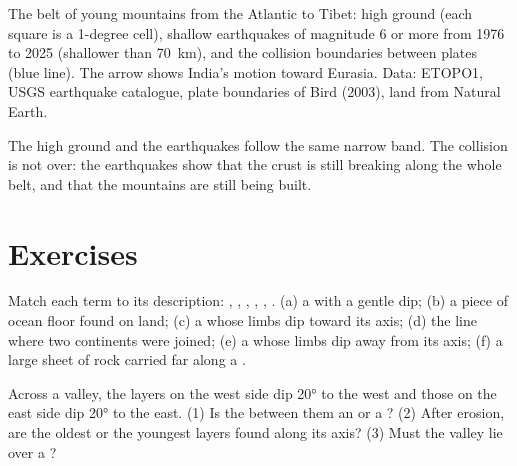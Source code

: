 \begin{omfigure}
{\small The belt of young mountains from the Atlantic to Tibet: high ground
(each square is a 1-degree cell), shallow earthquakes of magnitude 6 or more
from 1976 to 2025 (shallower than \qty{70}{km}), and the collision
boundaries between plates (blue line). The arrow shows India's motion
toward Eurasia. Data: ETOPO1, USGS earthquake catalogue, plate boundaries of
Bird (2003), land from Natural Earth.}
\end{omfigure}

The high ground and the earthquakes follow the same narrow band. The
collision is not over: the earthquakes show that the crust is still breaking
along the whole belt, and that the mountains are still being built.

\section{Exercises}

\begin{exercise}[$\star$]\label{exo:g12:mountain-building:1}
Match each term to its description: , , , ,
, . (a) a  with a gentle dip; (b) a piece of
ocean floor found on land; (c) a  whose limbs dip toward its axis;
(d) the line where two continents were joined; (e) a  whose limbs dip
away from its axis; (f) a large sheet of rock carried far along a .
\end{exercise}

\begin{exercise}[$\star$]\label{exo:g12:mountain-building:2}
Across a valley, the layers on the west side dip \ang{20} to the west and
those on the east side dip \ang{20} to the east. (1) Is the  between them
an  or a ? (2) After erosion, are the oldest or the youngest
layers found along its axis? (3) Must the valley lie over a ?
\end{exercise}

